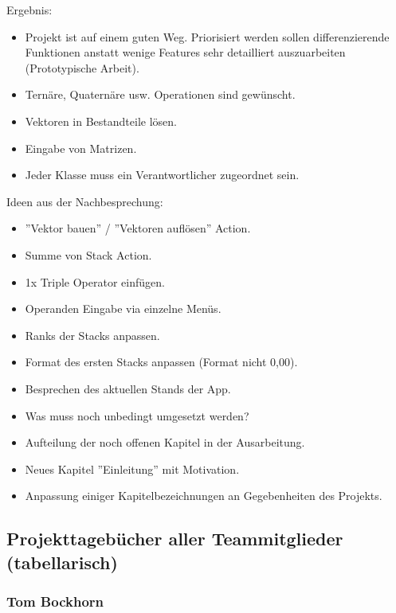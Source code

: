 Ergebnis:

\begin{itemize}
	\item Projekt ist auf einem guten Weg. Priorisiert werden sollen differenzierende Funktionen anstatt wenige Features sehr detailliert auszuarbeiten (Prototypische Arbeit).
	\item Ternäre, Quaternäre usw. Operationen sind gewünscht.
	\item Vektoren in Bestandteile lösen.
	\item Eingabe von Matrizen.
	\item Jeder Klasse muss ein Verantwortlicher zugeordnet sein.
\end{itemize}

Ideen aus der Nachbesprechung:

\begin{itemize}
	\item ''Vektor bauen'' / ''Vektoren auflösen'' Action. 
	\item Summe von Stack Action.
	\item 1x Triple Operator einfügen.
	\item Operanden Eingabe via einzelne Menüs.
	\item Ranks der Stacks anpassen.
	\item Format des ersten Stacks anpassen (Format nicht 0,00).
\end{itemize}


\begin{itemize}
	\item Besprechen des aktuellen Stands der App.
	\item Was muss noch unbedingt umgesetzt werden?
	\item Aufteilung der noch offenen Kapitel in der Ausarbeitung.
	\item Neues Kapitel ''Einleitung'' mit Motivation.
	\item Anpassung einiger Kapitelbezeichnungen an Gegebenheiten des Projekts.
\end{itemize}

\subsection{Projekttagebücher aller Teammitglieder (tabellarisch)}

\subsubsection{Tom Bockhorn}

